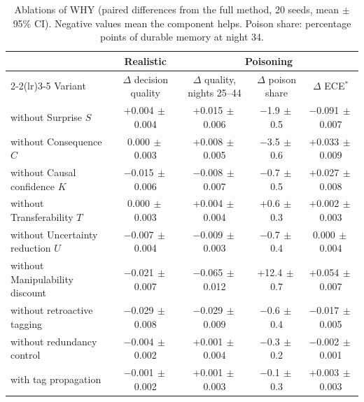 \begin{table}[t]
\centering\small
\caption{Ablations of WHY (paired differences from the full method, 20 seeds, mean $\pm$ 95\% CI). Negative values mean the component helps. Poison share: percentage points of durable memory at night 34.}
\label{tab:ablation}
\begin{tabular}{@{}lcccc@{}}
\toprule
& Realistic & \multicolumn{3}{c}{Poisoning} \\
\cmidrule(lr){2-2}\cmidrule(lr){3-5}
Variant & $\Delta$ decision quality & $\Delta$ quality, nights 25--44 & $\Delta$ poison share & $\Delta$ ECE$^\ast$\\
\midrule
without Surprise $S$ & +0.004{\scriptsize$\,\pm$0.004} & +0.015{\scriptsize$\,\pm$0.006} & $-$1.9{\scriptsize$\,\pm$0.5} & $-$0.091{\scriptsize$\,\pm$0.007}\\
without Consequence $C$ & 0.000{\scriptsize$\,\pm$0.003} & +0.008{\scriptsize$\,\pm$0.005} & $-$3.5{\scriptsize$\,\pm$0.6} & +0.033{\scriptsize$\,\pm$0.009}\\
without Causal confidence $K$ & $-$0.015{\scriptsize$\,\pm$0.006} & $-$0.008{\scriptsize$\,\pm$0.007} & $-$0.7{\scriptsize$\,\pm$0.5} & +0.027{\scriptsize$\,\pm$0.008}\\
without Transferability $T$ & 0.000{\scriptsize$\,\pm$0.003} & +0.004{\scriptsize$\,\pm$0.004} & +0.6{\scriptsize$\,\pm$0.3} & +0.002{\scriptsize$\,\pm$0.003}\\
without Uncertainty reduction $U$ & $-$0.007{\scriptsize$\,\pm$0.004} & $-$0.009{\scriptsize$\,\pm$0.003} & $-$0.7{\scriptsize$\,\pm$0.4} & 0.000{\scriptsize$\,\pm$0.004}\\
without Manipulability discount & $-$0.021{\scriptsize$\,\pm$0.007} & $-$0.065{\scriptsize$\,\pm$0.012} & +12.4{\scriptsize$\,\pm$0.7} & +0.054{\scriptsize$\,\pm$0.007}\\
without retroactive tagging & $-$0.029{\scriptsize$\,\pm$0.008} & $-$0.029{\scriptsize$\,\pm$0.009} & $-$0.6{\scriptsize$\,\pm$0.4} & $-$0.017{\scriptsize$\,\pm$0.005}\\
without redundancy control & $-$0.004{\scriptsize$\,\pm$0.002} & +0.001{\scriptsize$\,\pm$0.004} & $-$0.3{\scriptsize$\,\pm$0.2} & $-$0.002{\scriptsize$\,\pm$0.001}\\
with tag propagation & $-$0.001{\scriptsize$\,\pm$0.002} & +0.001{\scriptsize$\,\pm$0.003} & $-$0.1{\scriptsize$\,\pm$0.3} & +0.003{\scriptsize$\,\pm$0.003}\\
\bottomrule
\end{tabular}
\end{table}
